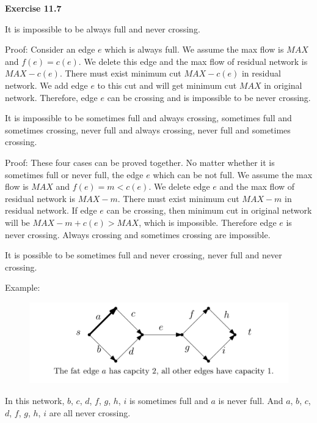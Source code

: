 \documentclass{article} %
\begin{document}
\textbf{Exercise 11.7}\par
	It is impossible to be always full and never crossing.\par
	Proof: Consider an edge $e$ which is always full. We assume the max flow is $MAX$ and $f(e)=c(e)$. We delete this edge and the max flow of residual network is $MAX-c(e)$.
	There must exist minimum cut $MAX-c(e)$ in residual network. We add edge $e$ to this cut and will get minimum cut $MAX$ in original network. Therefore, edge $e$ can be crossing and  is impossible to be never crossing.\par
	It is impossible to be sometimes full and always crossing, sometimes full and sometimes crossing, never full and always crossing, never full and sometimes crossing.\par
	Proof: These four cases can be proved together. No matter whether it is sometimes full or never full, the edge $e$ which can be not full. We assume the max flow is $MAX$ and 
	$f(e)=m<c(e)$. We delete edge $e$ and the max flow of residual network is $MAX-m$. There must exist minimum cut $MAX-m$ in residual network. If edge $e$ can be crossing, then 
	minimum cut in 	original network will be $MAX-m+c(e)>MAX$, which is impossible. Therefore edge $e$ is never crossing. Always crossing and sometimes crossing are impossible.\par
	It is possible to be sometimes full and never crossing, never full and never crossing.\par
	Example:\par
	\begin{figure}[H]
  	\centering
  	\includegraphics[scale=0.5]{1.png}
  	\caption{}
  	\label{}
  	\end{figure}
	In this network, $b$, $c$, $d$, $f$, $g$, $h$, $i$ is sometimes full and $a$ is never full. And $a$, $b$, $c$, $d$, $f$, $g$, $h$, $i$ are all never crossing.\par
	 
\end{document}
